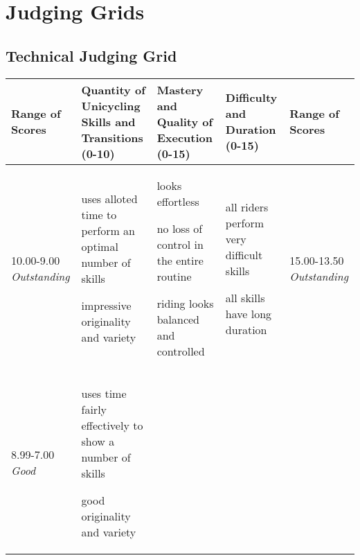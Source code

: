 \chapter{Judging Grids}
\section{Technical Judging Grid}
\begin{minipage}{\textwidth}
\begingroup
    \fontsize{7pt}{9pt}\selectfont
\setlength{\LTleft}{-2.5cm}
\begin{longtable}{|p{1.5cm}|p{5cm}|p{5cm}|p{5cm}|p{1.5cm}|}
\hline
\textbf{Range of Scores} &
\textbf{Quantity of Unicycling Skills and \newline Transitions (0-10)} &
\textbf{Mastery and Quality of Execution \newline (0-15)} &
\textbf{Difficulty and Duration \newline (0-15)} &
\textbf{Range of Scores} \\
\hline
10.00-9.00 \newline
\emph{Outstanding} &

\begin{judging_items}%
\item uses alloted time to perform an optimal number of skills
\item impressive originality and variety
\end{judging_items} &

\begin{judging_items}%
\item looks effortless
\item no loss of control in the entire routine
\item riding looks balanced and controlled
\end{judging_items} &

\begin{judging_items}%
\item all riders perform very difficult skills
\item all skills have long duration
\end{judging_items} &

15.00-13.50 \newline
\emph{Outstanding} \\
\hline

8.99-7.00 \newline
\emph{Good} &

\begin{judging_items}%
\item uses time fairly effectively to show a number of skills
\item good originality and variety
\end{judging_items} &


\end{longtable}
\end{minipage}

